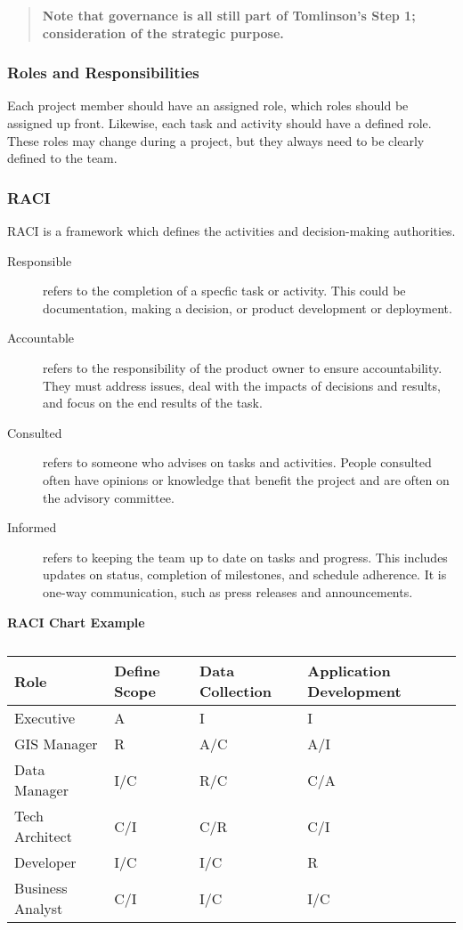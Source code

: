 \documentclass[
  letterpaper,
  DIV=11,
  numbers=noendperiod]{scrartcl}
\begin{document}
\begin{quote}
\textbf{Note that governance is all still part of Tomlinson's Step 1;
consideration of the strategic purpose.}
\end{quote}

\subsubsection{Roles and
Responsibilities}\label{roles-and-responsibilities}

Each project member should have an assigned role, which roles should be
assigned up front. Likewise, each task and activity should have a
defined role. These roles may change during a project, but they always
need to be clearly defined to the team.

\subsubsection{RACI}\label{raci}

RACI is a framework which defines the activities and decision-making
authorities.

\begin{description}
\item[Responsible]
refers to the completion of a specfic task or activity. This could be
documentation, making a decision, or product development or deployment.
\item[Accountable]
refers to the responsibility of the product owner to ensure
accountability. They must address issues, deal with the impacts of
decisions and results, and focus on the end results of the task.
\item[Consulted]
refers to someone who advises on tasks and activities. People consulted
often have opinions or knowledge that benefit the project and are often
on the advisory committee.
\item[Informed]
refers to keeping the team up to date on tasks and progress. This
includes updates on status, completion of milestones, and schedule
adherence. It is one-way communication, such as press releases and
announcements.
\end{description}

\newpage{}

\textbf{RACI Chart Example}

\begin{longtable}[t]{llll}

\caption{\label{tbl-raci-example}}

\tabularnewline

\toprule
Role & Define Scope & Data Collection & Application Development\\
\midrule
Executive & A & I & I\\
GIS Manager & R & A/C & A/I\\
Data Manager & I/C & R/C & C/A\\
Tech Architect & C/I & C/R & C/I\\
Developer & I/C & I/C & R\\
\addlinespace
Business Analyst & C/I & I/C & I/C\\
\bottomrule

\end{longtable}
\end{document}

